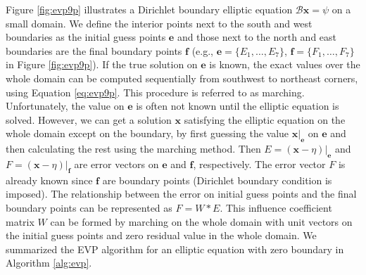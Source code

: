 
Figure \ref{fig:evp9p} illustrates a Dirichlet boundary
elliptic equation $\mathcal{B}\textbf{x} = \psi$ on a small domain.  We
define the interior points next to the south and west boundaries as
the initial guess points $\textbf{e}$ and those next to the north and
east boundaries are the final boundary points $\textbf{f}$ (e.g.,
$\textbf{e}= \{E_1, \dots, E_7\}$, $\textbf{f}= \{F_1, \dots, F_7\}$
in Figure \ref{fig:evp9p}).  If the true solution on $\textbf{e}$ is
known, the exact values over the whole domain can be computed
sequentially from southwest to northeast corners, using Equation
\ref{eq:evp9p}. This procedure is referred to as marching.
Unfortunately, the value on $\textbf{e}$ is often not known until the
elliptic equation is solved.  However, we can get a solution
$\textbf{x}$ satisfying the elliptic equation on the whole domain
except on the boundary, by first guessing the value
$\textbf{x}|_\textbf{e}$ on $\textbf{e}$ and then calculating the rest
using the marching method.  Then $E=(\textbf{x} -\eta)|_\textbf{e}$
and $F=(\textbf{x} -\eta)|_\textbf{f}$ are error vectors on
$\textbf{e}$ and $\textbf{f}$, respectively.  The error vector $F$ is
already known since $\textbf{f}$ are boundary points (Dirichlet
boundary condition is imposed).  The relationship between the error on
initial guess points and the final boundary points can be represented
as $F=W*E$.  This influence coefficient matrix $W$ can be formed by
marching on the whole domain with unit vectors on the initial guess
points and zero residual value in the whole domain.  We summarized
the EVP algorithm for an elliptic equation with zero boundary in
Algorithm \ref{alg:evp}.


